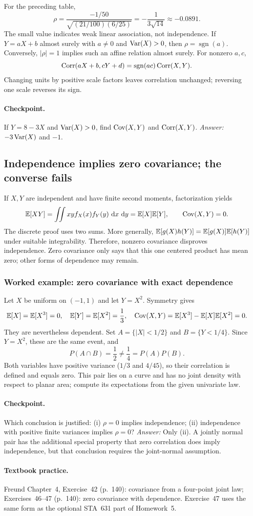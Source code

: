For the preceding table,
\[
 \rho=\frac{-1/50}{\sqrt{(21/100)(6/25)}}
 =-\frac1{3\sqrt{14}}\approx-0.0891.
\]
The small value indicates weak linear association, not independence. If $Y=aX+b$ almost surely with $a\ne0$ and $\operatorname{Var}(X)>0$, then $\rho=\operatorname{sgn}(a)$. Conversely, $|\rho|=1$ implies such an affine relation almost surely. For nonzero $a,c$,
\[
 \operatorname{Corr}(aX+b,cY+d)=\operatorname{sgn}(ac)\operatorname{Corr}(X,Y).
\]
Changing units by positive scale factors leaves correlation unchanged; reversing one scale reverses its sign.

\paragraph{Checkpoint.} If $Y=8-3X$ and $\operatorname{Var}(X)>0$, find $\operatorname{Cov}(X,Y)$ and $\operatorname{Corr}(X,Y)$. \emph{Answer:} $-3\operatorname{Var}(X)$ and $-1$.

\subsection{Independence implies zero covariance; the converse fails}
If $X,Y$ are independent and have finite second moments, factorization yields
\[
 \mathbb E[XY]=\iint xy f_X(x)f_Y(y)\,\,\mathrm d x\,\,\mathrm d y
 =\mathbb E[X]\mathbb E[Y],\qquad \operatorname{Cov}(X,Y)=0.
\]
The discrete proof uses two sums. More generally, $\mathbb E[g(X)h(Y)]=\mathbb E[g(X)]\mathbb E[h(Y)]$ under suitable integrability. Therefore, nonzero covariance disproves independence. Zero covariance only says that this one centered product has mean zero; other forms of dependence may remain.

\subsubsection*{Worked example: zero covariance with exact dependence}
Let $X$ be uniform on $(-1,1)$ and let $Y=X^2$. Symmetry gives
\[
 \mathbb E[X]=\mathbb E[X^3]=0,\quad \mathbb E[Y]=\mathbb E[X^2]=\frac13,
 \quad \operatorname{Cov}(X,Y)=\mathbb E[X^3]-\mathbb E[X]\mathbb E[X^2]=0.
\]
They are nevertheless dependent. Set $A=\{|X|<1/2\}$ and $B=\{Y<1/4\}$. Since $Y=X^2$, these are the same event, and
\[
 P(A\cap B)=\frac12\ne\frac14=P(A)P(B).
\]
Both variables have positive variance ($1/3$ and $4/45$), so their correlation is defined and equals zero. This pair lies on a curve and has no joint density with respect to planar area; compute its expectations from the given univariate law.

\paragraph{Checkpoint.} Which conclusion is justified: (i) $\rho=0$ implies independence; (ii) independence with positive finite variances implies $\rho=0$? \emph{Answer:} Only (ii). A jointly normal pair has the additional special property that zero correlation does imply independence, but that conclusion requires the joint-normal assumption.

\paragraph{Textbook practice.} Freund Chapter~4, Exercise~42 (p.~140): covariance from a four-point joint law; Exercises~46--47 (p.~140): zero covariance with dependence. Exercise~47 uses the same form as the optional STA~631 part of Homework~5.

